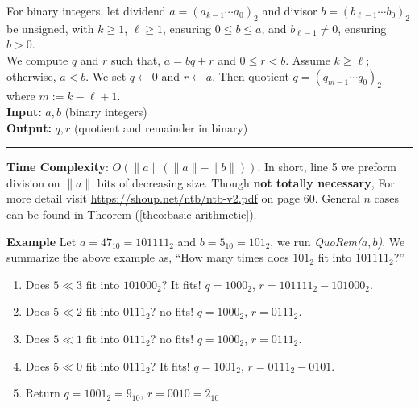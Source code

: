 \begin{Func}

    \label{func:QuoRem}

    For binary integers, let dividend $a = (a_{k-1} \cdots a_0)_2$ and divisor $b = (b_{\ell-1} \cdots b_0)_2$ be unsigned, with $k \geq 1$,
    $\ell \geq 1$, ensuring $0 \leq b \leq a$, and $b_{\ell-1} \neq 0$, ensuring $b > 0$.\\ 
    
    \noindent
    We compute $q$ and $r$ such that, $a = bq + r$ and $0 \leq r < b$. 
    Assume $k \geq \ell$; otherwise, $a < b$. We set $q \gets 0$ and $r \gets a$. 
    Then quotient $q = (q_{m-1} \cdots q_0)_2$ where $m := k - \ell + 1$.\\

    \noindent
    \textbf{Input:} $a, b$ (binary integers)\\
    \noindent
    \textbf{Output:} $q, r$ (quotient and remainder in binary)\\
    \begin{algorithm}[H]
        \SetAlgoLined
    \end{algorithm}
    \noindent\rule{\textwidth}{0.4pt}
    \noindent

    \noindent
    \textbf{Time Complexity}: $O(\|a\|(\|a\| - \|b\|))$. In short, line 5 we preform division on $\|a\|$ bits of decreasing size. 
    Though \textbf{not totally necessary}, For more
    detail visit \url{https://shoup.net/ntb/ntb-v2.pdf} on page 60. General $n$ cases can be found in Theorem (\ref{theo:basic-arithmetic}).
\end{Func}

\noindent
\textbf{Example} Let $a = 47_{10} = 101111_2$ and $b = 5_{10} = 101_2$, we run \textit{QuoRem($a,b$)}. We summarize the above example as, ``How many times does $101_2$ fit into $101111_2$?''
\begin{enumerate}
    \item  Does $5\ll 3$ fit into $101000_2$? It fits! $q=1000_2$, $r = 101111_2 - 101000_2$.
    \item  Does $5\ll 2$ fit into $0111_2$? no fits! $q=1000_2$, $r = 0111_2$.
    \item  Does $5\ll 1$ fit into $0111_2$? no fits! $q=1000_2$, $r = 0111_2$.
    \item  Does $5\ll 0$ fit into $0111_2$? It fits! $q=1001_2$, $r = 0111_2-0101$.
    \item  Return $q=1001_2=9_{10}$, $r = 0010 = 2_{10}$ 
\end{enumerate}

